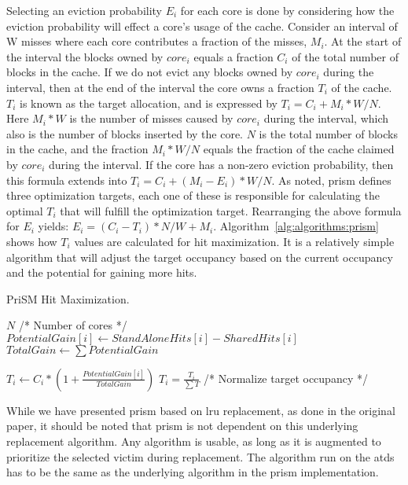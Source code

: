 Selecting an eviction probability $E_i$ for each core is done by considering how the eviction probability will effect a core's usage of the cache.
Consider an interval of W misses where each core contributes a fraction of the misses, $M_i$.
At the start of the interval the blocks owned by $core_i$ equals a fraction $C_i$ of the total number of blocks in the cache.
If we do not evict any blocks owned by $core_i$ during the interval, then at the end of the interval the core owns a fraction $T_i$ of the cache.
$T_i$ is known as the target allocation, and is expressed by $T_i = C_i + M_i * W/N$. 
Here $M_i * W$ is the number of misses caused by $core_i$ during the interval, which also is the number of blocks inserted by the core.
$N$ is the total number of blocks in the cache, and the fraction $M_i * W/N$ equals the fraction of the cache claimed by $core_i$ during the interval.
If the core has a non-zero eviction probability, then this formula extends into $T_i = C_i + (M_i - E_i) * W/N$.
As noted, \gls{prism} defines three optimization targets, each one of these is responsible for calculating the optimal $T_i$ that will fulfill the optimization target.
Rearranging the above formula for $E_i$ yields: $E_i = (C_i - T_i) * N/W + M_i$.
Algorithm~\ref{alg:algorithms:prism} shows how $T_i$ values are calculated for hit maximization.
It is a relatively simple algorithm that will adjust the target occupancy based on the current occupancy and the potential for gaining more hits.

\begin{algorithm}[ht]
\caption{PriSM Hit Maximization.}
\label{alg:algorithms:prism}
\begin{algorithmic}[1]
\State $N$ /* Number of cores */
    \State $PotentialGain[i]\gets StandAloneHits[i] - SharedHits[i]$
\EndFor
\State $TotalGain\gets \sum{PotentialGain}$

    \State $T_i\gets C_i * (1 + \frac{PotentialGain[i]}{TotalGain})$
\EndFor
\State $T_i = \frac{T_i}{\sum{T}}$ /* Normalize target occupancy */
\end{algorithmic}
\end{algorithm}

While we have presented \gls{prism} based on \gls{lru} replacement, as done in the original paper, it should be noted that \gls{prism} is not dependent on this underlying replacement algorithm.
Any algorithm is usable, as long as it is augmented to prioritize the selected victim during replacement.
The algorithm run on the \glspl{atd} has to be the same as the underlying algorithm in the \gls{prism} implementation.